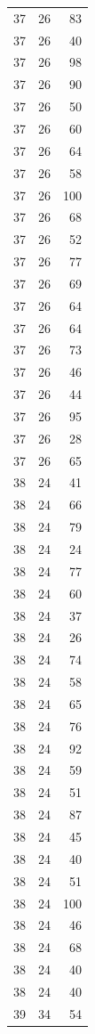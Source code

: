 \documentclass[
  letterpaper,
  DIV=11,
  numbers=noendperiod]{scrreprt}
\renewcommand{\[}{\begin{equation}}
\renewcommand{\]}{\end{equation}}
\begin{document}
\begin{table}
\begin{tabular*}{\linewidth}{@{\extracolsep{\fill}}rrr}
37 & 26 & 83 \\ 
37 & 26 & 40 \\ 
37 & 26 & 98 \\ 
37 & 26 & 90 \\ 
37 & 26 & 50 \\ 
37 & 26 & 60 \\ 
37 & 26 & 64 \\ 
37 & 26 & 58 \\ 
37 & 26 & 100 \\ 
37 & 26 & 68 \\ 
37 & 26 & 52 \\ 
37 & 26 & 77 \\ 
37 & 26 & 69 \\ 
37 & 26 & 64 \\ 
37 & 26 & 64 \\ 
37 & 26 & 73 \\ 
37 & 26 & 46 \\ 
37 & 26 & 44 \\ 
37 & 26 & 95 \\ 
37 & 26 & 28 \\ 
37 & 26 & 65 \\ 
38 & 24 & 41 \\ 
38 & 24 & 66 \\ 
38 & 24 & 79 \\ 
38 & 24 & 24 \\ 
38 & 24 & 77 \\ 
38 & 24 & 60 \\ 
38 & 24 & 37 \\ 
38 & 24 & 26 \\ 
38 & 24 & 74 \\ 
38 & 24 & 58 \\ 
38 & 24 & 65 \\ 
38 & 24 & 76 \\ 
38 & 24 & 92 \\ 
38 & 24 & 59 \\ 
38 & 24 & 51 \\ 
38 & 24 & 87 \\ 
38 & 24 & 45 \\ 
38 & 24 & 40 \\ 
38 & 24 & 51 \\ 
38 & 24 & 100 \\ 
38 & 24 & 46 \\ 
38 & 24 & 68 \\ 
38 & 24 & 40 \\ 
38 & 24 & 40 \\ 
39 & 34 & 54 \\ 

\end{tabular*}
\end{table}
\end{document}

